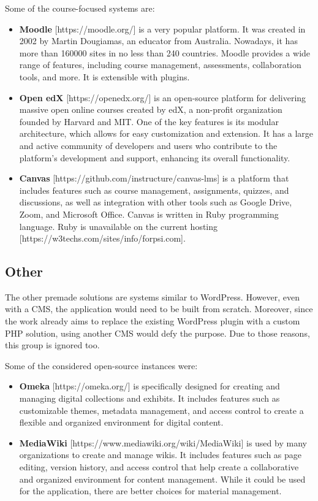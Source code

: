 \documentclass[
  digital,     %
  oneside,     %
  nosansbold,  %
  colorbold, %
  lof,         %
  lot,         %
]{fithesis4}
\begin{document}
Some of the course-focused systems are:
\begin{itemize}

	\item \textbf{Moodle} [https://moodle.org/] is a very popular platform. It was created in 2002 by Martin Dougiamas, an educator from Australia. Nowadays, it has more than 160000 sites in no less than 240 countries. Moodle provides a wide range of features, including course management, assessments, collaboration tools, and more. It is extensible with plugins.

	\item \textbf{Open edX} [https://openedx.org/] is an open-source platform for delivering massive open online courses created by edX, a non-profit organization founded by Harvard and MIT. One of the key features is its modular architecture, which allows for easy customization and extension. It has a large and active community of developers and users who contribute to the platform's development and support, enhancing its overall functionality.

	\item \textbf{Canvas} [https://github.com/instructure/canvas-lms] is a platform that includes features such as course management, assignments, quizzes, and discussions, as well as integration with other tools such as Google Drive, Zoom, and Microsoft Office. Canvas is written in Ruby programming language. Ruby is unavailable on the current hosting [https://w3techs.com/sites/info/forpsi.com].

\end{itemize}

\subsection{Other}

The other premade solutions are systems similar to WordPress. However, even with a CMS, the application would need to be built from scratch. Moreover, since the work already aims to replace the existing WordPress plugin with a custom PHP solution, using another CMS would defy the purpose. Due to those reasons, this group is ignored too.

Some of the considered open-source instances were:
\begin{itemize}

	\item \textbf{Omeka} [https://omeka.org/] is specifically designed for creating and managing digital collections and exhibits. It includes features such as customizable themes, metadata management, and access control to create a flexible and organized environment for digital content.
	
	\item \textbf{MediaWiki} [https://www.mediawiki.org/wiki/MediaWiki] is used by many organizations to create and manage wikis. It includes features such as page editing, version history, and access control that help create a collaborative and organized environment for content management. While it could be used for the application, there are better choices for material management.

\end{itemize}
\end{document}
